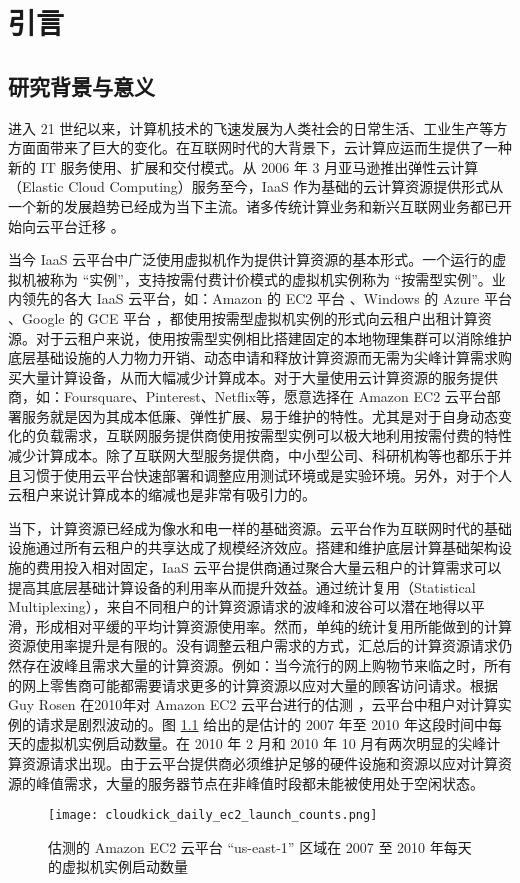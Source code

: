 \chapter{引言}
\label{cha:intro}

\section{研究背景与意义}
进入 21 世纪以来，计算机技术的飞速发展为人类社会的日常生活、工业生产等方方面面带来了巨大的变化。在互联网时代的大背景下，云计算应运而生提供了一种新的 IT 服务使用、扩展和交付模式。从 2006 年 3 月亚马逊推出弹性云计算（Elastic Cloud Computing）服务至今，IaaS 作为基础的云计算资源提供形式从一个新的发展趋势已经成为当下主流。诸多传统计算业务和新兴互联网业务都已开始向云平台迁移 \cite{Armbrust:2010:VCC:1721654.1721672}。

当今 IaaS 云平台中广泛使用虚拟机作为提供计算资源的基本形式。一个运行的虚拟机被称为 ``实例''，支持按需付费计价模式的虚拟机实例称为 ``按需型实例''。业内领先的各大 IaaS 云平台，如：Amazon 的 EC2 平台 \cite{AWS}、Windows 的 Azure 平台 \cite{Azure}、Google 的 GCE 平台 \cite{GCE}，都使用按需型虚拟机实例的形式向云租户出租计算资源。对于云租户来说，使用按需型实例相比搭建固定的本地物理集群可以消除维护底层基础设施的人力物力开销、动态申请和释放计算资源而无需为尖峰计算需求购买大量计算设备，从而大幅减少计算成本。对于大量使用云计算资源的服务提供商，如：Foursquare、Pinterest、Netflix等，愿意选择在 Amazon EC2 云平台部署服务就是因为其成本低廉、弹性扩展、易于维护的特性。尤其是对于自身动态变化的负载需求，互联网服务提供商使用按需型实例可以极大地利用按需付费的特性减少计算成本。除了互联网大型服务提供商，中小型公司、科研机构等也都乐于并且习惯于使用云平台快速部署和调整应用测试环境或是实验环境。另外，对于个人云租户来说计算成本的缩减也是非常有吸引力的。

当下，计算资源已经成为像水和电一样的基础资源。云平台作为互联网时代的基础设施通过所有云租户的共享达成了规模经济效应。搭建和维护底层计算基础架构设施的费用投入相对固定，IaaS 云平台提供商通过聚合大量云租户的计算需求可以提高其底层基础计算设备的利用率从而提升效益。通过统计复用（Statistical Multiplexing），来自不同租户的计算资源请求的波峰和波谷可以潜在地得以平滑，形成相对平缓的平均计算资源使用率。然而，单纯的统计复用所能做到的计算资源使用率提升是有限的。没有调整云租户需求的方式，汇总后的计算资源请求仍然存在波峰且需求大量的计算资源。例如：当今流行的网上购物节来临之时，所有的网上零售商可能都需要请求更多的计算资源以应对大量的顾客访问请求。根据 Guy Rosen 在2010年对 Amazon EC2 云平台进行的估测 \cite{ec2dailyusage}，云平台中租户对计算实例的请求是剧烈波动的。图 \ref{figure:daily_ec2_launch_counts} 给出的是估计的 2007 年至 2010 年这段时间中每天的虚拟机实例启动数量。在 2010 年 2 月和 2010 年 10 月有两次明显的尖峰计算资源请求出现。由于云平台提供商必须维护足够的硬件设施和资源以应对计算资源的峰值需求，大量的服务器节点在非峰值时段都未能被使用处于空闲状态。
\begin{figure}
  \centering
  \texttt{[image: cloudkick\_daily\_ec2\_launch\_counts.png]}
  \caption{估测的 Amazon EC2 云平台 ``us-east-1'' 区域在 2007 至 2010 年每天的虚拟机实例启动数量 \cite{ec2dailyusage}}
  \label{figure:daily_ec2_launch_counts}
\end{figure}

